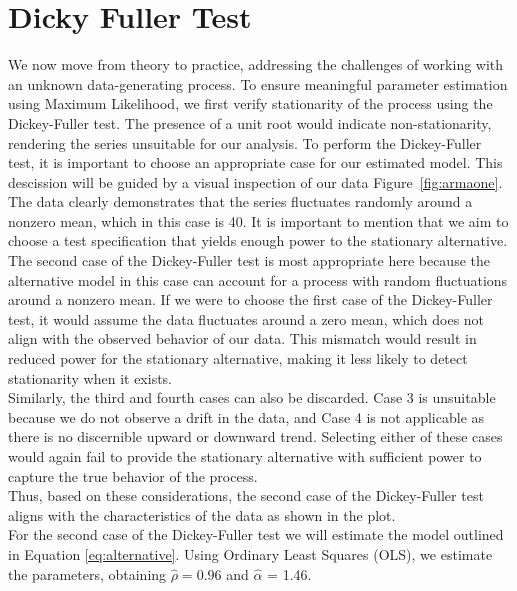\documentclass[11pt]{article}
\begin{document}
\section{Dicky Fuller Test}
We now move from theory to practice, addressing the challenges of working with an unknown data-generating process. 
To ensure meaningful parameter estimation using Maximum Likelihood, we first verify stationarity of the process using the Dickey-Fuller test.
The presence of a unit root would indicate non-stationarity, rendering the series unsuitable for our analysis.
To perform the Dickey-Fuller test, it is important to choose an appropriate case for our estimated model.
This descission will be guided by a visual inspection of our data Figure~\ref{fig:armaone}.
The data clearly demonstrates that the series fluctuates randomly around a nonzero mean, which in this case is 40.
It is important to mention that we aim to choose a test specification that yields enough power to the stationary alternative.
The second case of the Dickey-Fuller test is most appropriate here because the alternative model in this case can account for a process with random fluctuations around a nonzero mean. 
If we were to choose the first case of the Dickey-Fuller test, it would assume the data fluctuates around a zero mean, which does not align with the observed behavior of our data.
 This mismatch would result in reduced power for the stationary alternative, making it less likely to detect stationarity when it exists.\\
Similarly, the third and fourth cases can also be discarded. Case 3 is unsuitable because we do not observe a drift in the data, and Case 4 is not applicable as there is no discernible upward or downward trend. Selecting either of these cases would again fail to provide the stationary alternative with sufficient power to capture the true behavior of the process.\\
Thus, based on these considerations, the second case of the Dickey-Fuller test aligns with the characteristics of the data as shown in the plot.\\
For the second case of the Dickey-Fuller test we will estimate the model outlined in Equation \eqref{eq:alternative}.
Using Ordinary Least Squares (OLS), we estimate the parameters, obtaining $\hat{\rho} = 0.96$ and $\hat{\alpha}$ = 1.46. 
\end{document}

